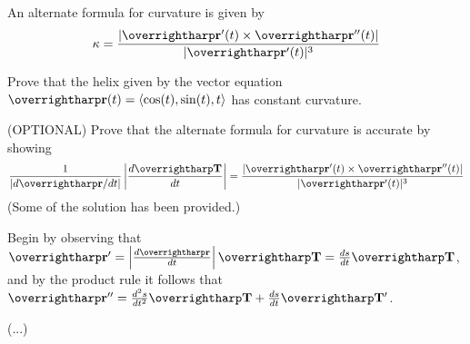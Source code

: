 \documentclass[letterpaper, twoside, 12pt]{book}
\begin{document}
\begin{theorem}
  An alternate formula for curvature is given by
  \[
    \kappa =
    \frac{|\vect{r}'(t)\times\vect{r}''(t)|}{|\vect{r}'(t)|^3}
  \]
\end{theorem}

          \begin{problem}
            Prove that the helix given by the vector equation
            $\vect{r}(t) = \<\cos(t),\sin(t),t\>$
            has constant curvature.
          \end{problem}

          \begin{solution}

          \end{solution}

          \begin{problem}
            (OPTIONAL)
            Prove that the alternate formula for curvature is
            accurate by showing
            \[
              \frac{1}{|d\vect{r}/dt|}
              \left|
                \frac{d\vect{T}}{dt}
              \right|
                =
              \frac{|\vect{r}'(t)\times\vect{r}''(t)|}{|\vect{r}'(t)|^3}
            \]
            (Some of the solution has been provided.)
          \end{problem}

          \begin{solution}
            Begin by observing that
            $
              \vect{r}'
                =
              \left|\frac{d\vect{r}}{dt}\right|\vect{T}
                =
              \frac{ds}{dt}\vect{T}
            $, and by the product rule it follows that
            $
              \vect{r}''
                =
              \frac{d^2s}{dt^2}\vect{T} + \frac{ds}{dt}\vect{T}'
            $.

            (...)

          \end{solution}
\end{document}
